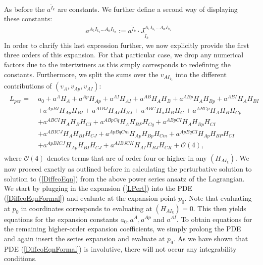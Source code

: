 As before the $a^{\tilde{I}_k}$ are constants.
We further define a second way of displaying these constants:
\begin{align}
    a^{A_1I_{k_1}...A_nI_{k_n}} := a^{\tilde{I}_k} \cdot J_{\tilde{I}_k}^{A_1I_{k_1}...A_nI_{k_n}}
\end{align}
In order to clarify this last expression further, we now explicitly provide the first three orders of this expansion. For that particular case, we drop any numerical factors due to the intertwiners as this simply corresponds to redefining the constants. Furthermore, we split the sums over the $v_{AI_{k_i}}$ into the different contributions of $(v_A,v_{Ap},v_{AI})$:
\begin{align}\label{LPert}
\begin{aligned}
    L_{per} = \  &a_0 + a^A H_A + a^{Ap} H_{Ap} + a^{AI}H_{AI} + a^{AB} H_{A}H_{B} + a^{ABp}H_A H_{Bp} + a^{ABI} H_{A} H_{BI}\\
    &+a^{ApBI}H_{Ap} H_{BI} + a^{AIBJ} H_{AI}H_{BJ} + a^{ABC} H_a H_B H_C 
    + a^{ABCp} H_A H_B H_{Cp} \\
    &+a^{ABCI} H_A H_B H_{CI} + a^{ABpCq} H_{A}H_{BP}H_{Cq} + a^{ABpCI} H_A H_{Bp} H_{CI}\\
    &+ a^{ABICJ} H_A H_{BI}H_{CJ} 
    + a^{ApBqCm} H_{Ap} H_{Bp} H_{Cm}+ a^{ApBq CI} H_{Ap} H_{BP} H_{CI}\\
    &+ a^{Ap BI CJ} H_{Ap} H_{BI} H_{CJ} + a^{AIBJCK} H_{AI} H_{BJ} H_{CK} + \mathcal{O}(4),
\end{aligned}
\end{align}
where $\mathcal{O}(4)$ denotes terms that are of order four or higher in any $(H_{AI_k})$. We now proceed exactly as outlined before in calculating the perturbative solution to solution to (\ref{DiffeoEqn}) from the above power series ansatz of the Lagrangian. We start by plugging in the expansion (\ref{LPert}) into the PDE (\ref{DiffeoEqnFormal}) and evaluate at the expansion point $p_0$. Note that evaluating at $p_0$ in coordinates corresponds to evaluating at $(H_{AI_k})=0$. This then yields equations for the expansion constants $a_0, a^A, a^{Ap}$ and $a^{AI}$. To obtain equations for the remaining higher-order expansion coefficients, we simply prolong the PDE and again insert the series expansion and evaluate at $p_0$. As we have shown that PDE (\ref{DiffeoEqnFormal}) is involutive, there will not occur any integrability conditions.

